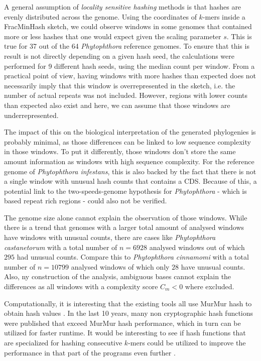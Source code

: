 A general assumption of \textit{locality sensitive hashing} methods is that
hashes are evenly distributed across the genome. Using the coordinates of
$k$-mers inside a FracMinHash sketch, we could observe windows in some genomes
that contained more or less hashes that one would expect given the scaling
parameter $s$. This is true for 37 out of the 64 \textit{Phytophthora} reference
genomes. To ensure that this is result is not directly depending on a given hash
seed, the calculations were performed for 9 different hash seeds, using the
median count per window. From a practical point of view, having windows with
more hashes than expected does not necessarily imply that this window is
overrepresented in the sketch, i.e. the number of actual repeats was not
included. However, regions with lower counts than expected also exist and here,
we can assume that those windows are underrepresented.

The impact of this on the biological interpretation of the generated phylogenies
is probably minimal, as those differences can be linked to low sequence
complexity in those windows. To put it differently, those windows don't store
the same amount information as windows with high sequence complexity. For the
reference genome of \textit{Phytophthora infestans}, this is also backed by the
fact that there is not a single window with unusual hash counts that contains a
CDS. Because of this, a potential link to the two-speeds-genome hypothesis for
\textit{Phytophthora} - which is based repeat rich regions - could also not be
verified.

The genome size alone cannot explain the observation of those windows. While
there is a trend that genomes with a larger total amount of analysed windows
have windows with unusual counts, there are cases like \textit{Phytophthora
castanetorum} with a total number of $n=6928$ analysed windows out of which
$295$ had unusual counts. Compare this to \textit{Phytophthora cinnamomi} with a
total number of $n=10799$ analysed windows of which only $28$ have unusual
counts. Also, ny construction of the analysis, ambiguous bases cannot explain
the differences as all windows with a complexity score $C_m < 0$ where excluded. 

Computationally, it is interesting that the existing tools all use MurMur hash
to obtain hash values
\cite{ondovMashFastGenome2016,bagciMicrobialPhylogeneticContext2021,irberLightweightCompositionalAnalysis2022}.
In the last 10 years, many non cryptographic hash functions were published that
exceed MurMur hash performance, which in turn can be utilized for faster
runtime. It would be interesting to see if hash functions that are specialized
for hashing consecutive $k$-mers could be utilized to improve the performance in
that part of the programs even further .

